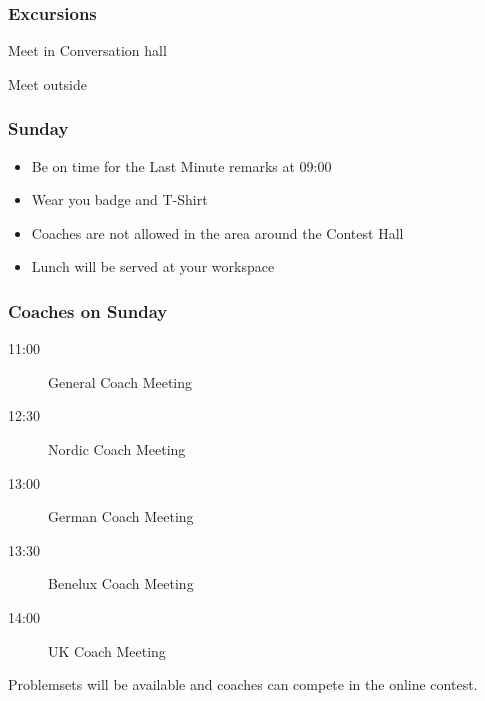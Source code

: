 \documentclass[t]{beamer}
\begin{document}
\begin{frame}
	\frametitle{Excursions}
	\begin{description}[l]
		\item[Beertasting] Meet in Conversation hall
		\item[Guided City Tour] Meet outside 
	\end{description}
\end{frame}
\begin{frame}
	\frametitle{Sunday}
	\begin{itemize}
	\item Be on time for the Last Minute remarks at 09:00
	\item Wear you badge and T-Shirt
	\item Coaches are not allowed in the area around the Contest Hall 
	\item Lunch will be served at your workspace
	\end{itemize}
\end{frame}
\begin{frame}
	\frametitle{Coaches on Sunday}
	\begin{description}
		\item[11:00] General Coach Meeting
		\item[12:30] Nordic Coach Meeting
		\item[13:00] German Coach Meeting
		\item[13:30] Benelux Coach Meeting 
		\item[14:00] UK Coach Meeting
	\end{description}
	Problemsets will be available and coaches can compete in the online contest.
\end{frame}
\end{document}
